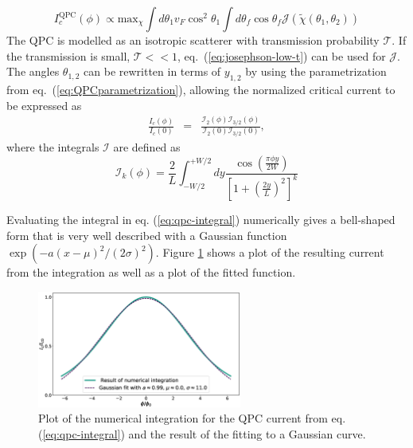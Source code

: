 \begin{equation}
I_c^{\text{QPC}}(\phi) \propto \text{max}_{\chi} \int d \theta_1 v_F \cos^2 \theta_1 \int d \theta_f \cos \theta_f \mathcal{J}\left( \tilde{\chi} (\theta_1, \theta_2) \right)
\end{equation}
The QPC is modelled as an isotropic scatterer with transmission probability $\mathcal{T}$. If the transmission is small, $\mathcal{T} << 1$, eq.~(\ref{eq:josephson-low-t}) can be used for $\mathcal{J}$.
The angles $\theta_{1, 2}$ can be rewritten in terms of $y_{1, 2}$ by using the parametrization from eq.~(\ref{eq:QPCparametrization}), allowing the normalized critical current to be expressed as
\begin{eqnarray}
\frac{I_c(\phi)}{I_c(0)} &=& \frac{\mathcal{I}_2(\phi)\mathcal{I}_{3/2}(\phi)}{\mathcal{I}_2(0)\mathcal{I}_{3/2}(0)}\label{eq:qpc-integral},
\end{eqnarray}
where the integrals $\mathcal{I}$ are defined as
\begin{equation}
\mathcal{I}_k(\phi) = \frac{2}{L}\int_{-W/2}^{+W/2}dy \frac{\cos\left(\frac{\pi\phi y}{2W}\right)}{\left[1 + \left(\frac{2y}{L}\right)^2 \right]^k}
\label{integral-qpc}
\end{equation}

Evaluating the integral in eq. (\ref{eq:qpc-integral}) numerically gives a bell-shaped form that is very well described with a Gaussian function $\exp ( -a (x-\mu)^2 / (2 \sigma)^2 )$. Figure \ref{fig:ic-qpc-gauss} shows a plot of the resulting current from the integration as well as a plot of the fitted function. 
\begin{figure}
\centering
\includegraphics[width=0.6\textwidth]{figure/analyticalmodel/qpc-numerical-integration-fit}
\caption{Plot of the numerical integration for the QPC current from eq. (\ref{eq:qpc-integral}) and the result of the fitting to a Gaussian curve.} \label{fig:ic-qpc-gauss}
\end{figure}
